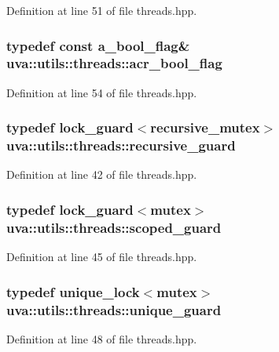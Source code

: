 Definition at line 51 of file threads.\+hpp.

\hypertarget{namespaceuva_1_1utils_1_1threads_a1c174d3a90b2b056554d897188ad2c74}{}
\subsubsection[{acr\+\_\+bool\+\_\+flag}]{\setlength{\rightskip}{0pt plus 5cm}typedef const {\bf a\+\_\+bool\+\_\+flag}\& {\bf uva\+::utils\+::threads\+::acr\+\_\+bool\+\_\+flag}}\label{namespaceuva_1_1utils_1_1threads_a1c174d3a90b2b056554d897188ad2c74}


Definition at line 54 of file threads.\+hpp.

\hypertarget{namespaceuva_1_1utils_1_1threads_aa60e14c02bcbc10b6c6f7d22062a48a4}{}
\subsubsection[{recursive\+\_\+guard}]{\setlength{\rightskip}{0pt plus 5cm}typedef lock\+\_\+guard$<$recursive\+\_\+mutex$>$ {\bf uva\+::utils\+::threads\+::recursive\+\_\+guard}}\label{namespaceuva_1_1utils_1_1threads_aa60e14c02bcbc10b6c6f7d22062a48a4}


Definition at line 42 of file threads.\+hpp.

\hypertarget{namespaceuva_1_1utils_1_1threads_afa446d9b32371c0185332204ce17034d}{}
\subsubsection[{scoped\+\_\+guard}]{\setlength{\rightskip}{0pt plus 5cm}typedef lock\+\_\+guard$<$mutex$>$ {\bf uva\+::utils\+::threads\+::scoped\+\_\+guard}}\label{namespaceuva_1_1utils_1_1threads_afa446d9b32371c0185332204ce17034d}


Definition at line 45 of file threads.\+hpp.

\hypertarget{namespaceuva_1_1utils_1_1threads_a449ea792fd1291bd13c4d438470ab158}{}
\subsubsection[{unique\+\_\+guard}]{\setlength{\rightskip}{0pt plus 5cm}typedef unique\+\_\+lock$<$mutex$>$ {\bf uva\+::utils\+::threads\+::unique\+\_\+guard}}\label{namespaceuva_1_1utils_1_1threads_a449ea792fd1291bd13c4d438470ab158}


Definition at line 48 of file threads.\+hpp.

